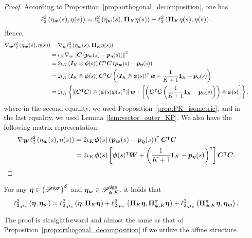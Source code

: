 \begin{proof}
According to Proposition~\ref{prop:orthogonal_decomposition}, one has
\begin{align*}
    \ell_2^2\left({{\eta}_{{\bm{w}}}(s),{\eta}(s)}\right)=\ell_2^2\left({{\eta}_{{\bm{w}}}(s),{\bm{\Pi}}_K{\eta}(s)}\right)+\ell_2^2\left({{\bm{\Pi}}_K{\eta}(s),{\eta}(s)}\right).
\end{align*}
Hence,
\begin{align*}
        \nabla_{{\bm{w}}} \ell_2^2\left({{\eta}_{{\bm{w}}}(s),{\eta}(s)}\right)&=\nabla_{{\bm{w}}}\ell_2^2\left({{\eta}_{{\bm{w}}}(s),{\bm{\Pi}}_K{\eta}(s)}\right)\\
        &=\iota_K\nabla_{{\bm{w}}}\left\|{{\bm{C}}\left({{\bm{p}}_{{\bm{w}}}(s)-{\bm{p}}_{\bm{\eta}}(s)}\right)}\right\|^2\\
        &=2\iota_K\left({{\bm{I}}_K\otimes{\bm{\phi}}(s)}\right){\bm{C}}^{\intercal}{\bm{C}}\left({{\bm{p}}_{{\bm{w}}}(s)-{\bm{p}}_{\bm{\eta}}(s)}\right)\\
        &=2\iota_K\left({{\bm{I}}_K\otimes{\bm{\phi}}(s)}\right){\bm{C}}^{\intercal}{\bm{C}}\left({\left({{\bm{I}}_K\otimes{\bm{\phi}}(s)}\right)^{\intercal}{\bm{w}}+\frac{1}{K+1}\bm{1}_{K}-{\bm{p}}_{\bm{\eta}}(s)}\right)\\
        &=2\iota_K \left\{{ \left[{\left({{\bm{C}}^{\intercal}{\bm{C}}}\right)\otimes\left({{\bm{\phi}}(s){\bm{\phi}}(s)^{\intercal}}\right)}\right]{\bm{w}}+  
 \left[{\left({{\bm{C}}^{\intercal}{\bm{C}}\left({\frac{1}{K+1}\bm{1}_{K}-{\bm{p}}_{\bm{\eta}}(s)}\right)}\right)\otimes {\bm{\phi}}(s)}\right]}\right\},
    \end{align*}
where in the second equality, we used Proposition~\ref{prop:PK_isometric}, and in the last equality, we used Lemma~\ref{lem:vector_outer_KP}.
We also have the following matrix representation:
\begin{align*}
        \nabla_{{\bm{W}}} \ell_2^2\left({{\eta}_{{\bm{w}}}(s),{\eta}(s)}\right)&=2\iota_K{\bm{\phi}}(s)\left({{\bm{p}}_{{\bm{w}}}(s)-{\bm{p}}_{\bm{\eta}}(s)}\right)^{\intercal}{\bm{C}}^{\intercal}{\bm{C}}\\
        &=2\iota_K{\bm{\phi}}(s)\left[{{\bm{\phi}}(s)^{\intercal}{\bm{W}}+\left({\frac{1}{K+1}\bm{1}_{K}-{\bm{p}}_{\bm{\eta}}(s)}\right)^{\intercal}}\right]{\bm{C}}^{\intercal}{\bm{C}}.
    \end{align*}
\end{proof}
\begin{proposition}\label{prop:orthogonal_decomposition_linear_approximation}
For any $\bm{\eta}\in\left({{\mathscr{P}}^{\mathsf{sign}}}\right)^{{\mathcal{S}}}$ and $\bm{\eta}_{{\bm{w}}}\in{\mathscr{P}}^{\mathsf{sign}}_{{\bm{\phi}},K}$, it holds that
\begin{equation*}
    \ell_{2,\mu_{\pi}}^2\left({\bm{\eta},\bm{\eta}_{{\bm{w}}}}\right)=\ell_{2,\mu_{\pi}}^2\left({\bm{\eta},{\bm{\Pi}}_{K}\bm{\eta}}\right)+\ell_{2,\mu_{\pi}}^2\left({{\bm{\Pi}}_{K}\bm{\eta},{\bm{\Pi}}_{{\bm{\phi}}, K}^{\pi}\bm{\eta}}\right)+\ell_{2,\mu_{\pi}}^2\left({{\bm{\Pi}}_{{\bm{\phi}}, K}^{\pi}\bm{\eta},\bm{\eta}_{{\bm{w}}}}\right).
\end{equation*}
\end{proposition}
The proof is straightforward and almost the same as that of Proposition~\ref{prop:orthogonal_decomposition} if we utilize the affine structure.

